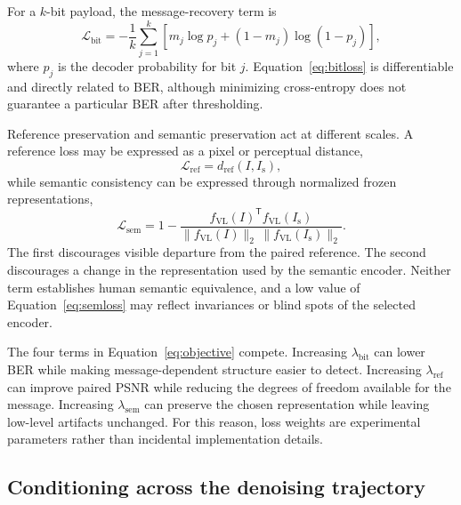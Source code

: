\documentclass[pdflatex,sn-mathphys-num]{sn-jnl}
\newcommand{\stego}{I_{\mathrm{s}}}
\begin{document}
For a $k$-bit payload, the message-recovery term is
\begin{equation}
\mathcal{L}_{\mathrm{bit}}
=-\frac{1}{k}\sum_{j=1}^{k}
\left[m_j\log p_j+(1-m_j)\log(1-p_j)\right],
\label{eq:bitloss}
\end{equation}
where $p_j$ is the decoder probability for bit $j$. Equation~\eqref{eq:bitloss} is differentiable and directly related to BER, although minimizing cross-entropy does not guarantee a particular BER after thresholding.

Reference preservation and semantic preservation act at different scales. A reference loss may be expressed as a pixel or perceptual distance,
\begin{equation}
\mathcal{L}_{\mathrm{ref}}=d_{\mathrm{ref}}(I,\stego),
\label{eq:refloss}
\end{equation}
while semantic consistency can be expressed through normalized frozen representations,
\begin{equation}
\mathcal{L}_{\mathrm{sem}}=
1-\frac{f_{\mathrm{VL}}(I)^{\mathsf{T}}f_{\mathrm{VL}}(\stego)}
{\|f_{\mathrm{VL}}(I)\|_2\,\|f_{\mathrm{VL}}(\stego)\|_2}.
\label{eq:semloss}
\end{equation}
The first discourages visible departure from the paired reference. The second discourages a change in the representation used by the semantic encoder. Neither term establishes human semantic equivalence, and a low value of Equation~\eqref{eq:semloss} may reflect invariances or blind spots of the selected encoder.

The four terms in Equation~\eqref{eq:objective} compete. Increasing $\lambda_{\mathrm{bit}}$ can lower BER while making message-dependent structure easier to detect. Increasing $\lambda_{\mathrm{ref}}$ can improve paired PSNR while reducing the degrees of freedom available for the message. Increasing $\lambda_{\mathrm{sem}}$ can preserve the chosen representation while leaving low-level artifacts unchanged. For this reason, loss weights are experimental parameters rather than incidental implementation details.

\subsection{Conditioning across the denoising trajectory}
\end{document}
